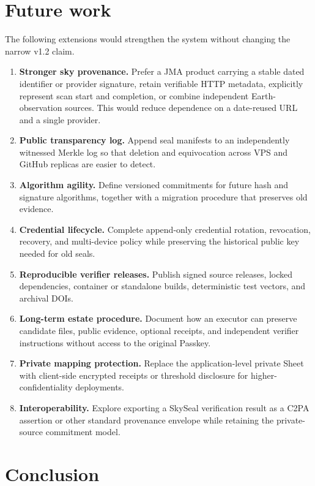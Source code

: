 \documentclass[11pt,a4paper]{article}
\begin{document}
\section{Future work}

The following extensions would strengthen the system without changing the narrow v1.2 claim.

\begin{enumerate}
  \item \textbf{Stronger sky provenance.} Prefer a JMA product carrying a stable dated identifier or provider signature, retain verifiable HTTP metadata, explicitly represent scan start and completion, or combine independent Earth-observation sources. This would reduce dependence on a date-reused URL and a single provider.
  \item \textbf{Public transparency log.} Append seal manifests to an independently witnessed Merkle log so that deletion and equivocation across VPS and GitHub replicas are easier to detect.
  \item \textbf{Algorithm agility.} Define versioned commitments for future hash and signature algorithms, together with a migration procedure that preserves old evidence.
  \item \textbf{Credential lifecycle.} Complete append-only credential rotation, revocation, recovery, and multi-device policy while preserving the historical public key needed for old seals.
  \item \textbf{Reproducible verifier releases.} Publish signed source releases, locked dependencies, container or standalone builds, deterministic test vectors, and archival DOIs.
  \item \textbf{Long-term estate procedure.} Document how an executor can preserve candidate files, public evidence, optional receipts, and independent verifier instructions without access to the original Passkey.
  \item \textbf{Private mapping protection.} Replace the application-level private Sheet with client-side encrypted receipts or threshold disclosure for higher-confidentiality deployments.
  \item \textbf{Interoperability.} Explore exporting a SkySeal verification result as a C2PA assertion or other standard provenance envelope while retaining the private-source commitment model.
\end{enumerate}

\section{Conclusion}
\end{document}
